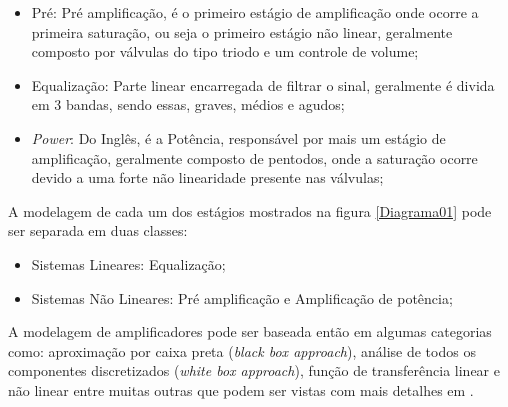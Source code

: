 \begin{itemize}
	\item Pré: Pré amplificação, é o primeiro estágio de amplificação onde ocorre a primeira saturação, ou seja o primeiro estágio não linear, geralmente composto por válvulas do tipo triodo e um controle de volume;
	\item Equalização: Parte linear encarregada de filtrar o sinal, geralmente é divida em 3 bandas, sendo essas, graves, médios e agudos;
	\item \textit{Power}: Do Inglês, é a Potência, responsável por mais um estágio de amplificação, geralmente composto de pentodos, onde a saturação ocorre devido a uma forte não linearidade presente nas válvulas;
\end{itemize}

A modelagem de cada um dos estágios mostrados na figura \ref{Diagrama01} pode ser separada em duas classes:

\begin{itemize}
	\item Sistemas Lineares: Equalização;
	\item Sistemas Não Lineares: Pré amplificação e Amplificação de potência; 
\end{itemize}


A modelagem de amplificadores pode ser baseada então em algumas categorias como: aproximação por caixa preta (\textit{black box approach}), análise de todos os componentes discretizados (\textit{white box approach}), função de transferência linear e não linear entre muitas outras que podem ser vistas com mais detalhes em \cite{pakarinen2009review}.

